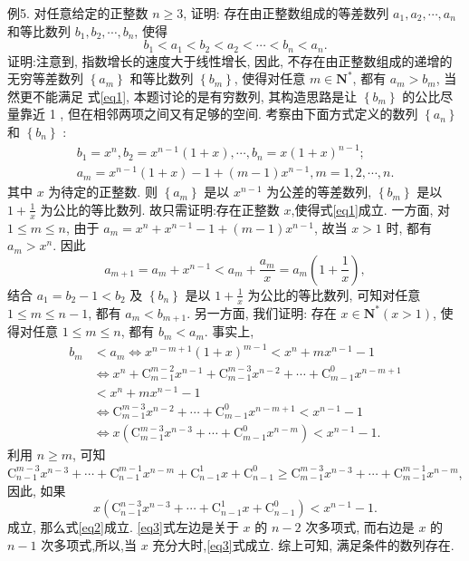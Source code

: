 例5. 对任意给定的正整数 $n \geqslant 3$, 证明: 存在由正整数组成的等差数列 $a_1, a_2, \cdots, a_n$ 和等比数列 $b_1, b_2, \cdots, b_n$, 使得
$$
b_1<a_1<b_2<a_2<\cdots<b_n<a_n . \label{eq1}
$$
证明:注意到, 指数增长的速度大于线性增长, 因此, 不存在由正整数组成的递增的无穷等差数列 $\left\{a_m\right\}$ 和等比数列 $\left\{b_m\right\}$, 使得对任意 $m \in \mathbf{N}^*$, 都有 $a_m>b_m$, 当然更不能满足 式\ref{eq1}, 本题讨论的是有穷数列, 其构造思路是让 $\left\{b_m\right\}$ 的公比尽量靠近 1 , 但在相邻两项之间又有足够的空间.
考察由下面方式定义的数列 $\left\{a_n\right\}$ 和 $\left\{b_n\right\}$ :
$$
\begin{gathered}
b_1=x^n, b_2=x^{n-1}(1+x), \cdots, b_n=x(1+x)^{n-1} ; \\
a_m=x^{n-1}(1+x)-1+(m-1) x^{n-1}, m=1,2, \cdots, n .
\end{gathered}
$$
其中 $x$ 为待定的正整数.
则 $\left\{a_m\right\}$ 是以 $x^{n-1}$ 为公差的等差数列, $\left\{b_m\right\}$ 是以 $1+\frac{1}{x}$
为公比的等比数列.
故只需证明:存在正整数 $x$,使得式\ref{eq1}成立.
一方面, 对 $1 \leqslant m \leqslant n$, 由于 $a_m=x^n+x^{n-1}-1+(m-1) x^{n-1}$, 故当 $x>1$ 时, 都有 $a_m>x^n$. 因此
$$
a_{m+1}=a_m+x^{n-1}<a_m+\frac{a_m}{x}=a_m\left(1+\frac{1}{x}\right),
$$
结合 $a_1=b_2-1<b_2$ 及 $\left\{b_n\right\}$ 是以 $1+\frac{1}{x}$ 为公比的等比数列, 可知对任意 $1 \leqslant m \leqslant n-1$, 都有 $a_m<b_{m+1}$.
另一方面, 我们证明: 存在 $x \in \mathbf{N}^*(x>1)$, 使得对任意 $1 \leqslant m \leqslant n$, 都有 $b_m<a_m$.
事实上,
$$
\begin{aligned}
b_m & <a_m \Leftrightarrow x^{n-m+1}(1+x)^{m-1}<x^n+m x^{n-1}-1 \\
& \Leftrightarrow x^n+\mathrm{C}_{m-1}^{m-2} x^{n-1}+\mathrm{C}_{m-1}^{m-3} x^{n-2}+\cdots+\mathrm{C}_{m-1}^0 x^{n-m+1} \\
& <x^n+m x^{n-1}-1 \\
& \Leftrightarrow \mathrm{C}_{m-1}^{m-3} x^{n-2}+\cdots+\mathrm{C}_{m-1}^0 x^{n-m+1}<x^{n-1}-1 \\
& \Leftrightarrow x\left(\mathrm{C}_{m-1}^{m-3} x^{n-3}+\cdots+\mathrm{C}_{m-1}^0 x^{n-m}\right)<x^{n-1}-1 .
\end{aligned} \label{eq2}
$$
利用 $n \geqslant m$, 可知 $\mathrm{C}_{n-1}^{m-3} x^{n-3}+\cdots+\mathrm{C}_{n-1}^{m-1} x^{n-m}+\mathrm{C}_{n-1}^1 x+\mathrm{C}_{n-1}^0 \geqslant \mathrm{C}_{m-1}^{m-3} x^{n-3}+\cdots+ \mathrm{C}_{m-1}^{m-1} x^{n-m}$, 因此, 如果
$$
x\left(\mathrm{C}_{n-1}^{n-3} x^{n-3}+\cdots+\mathrm{C}_{n-1}^1 x+\mathrm{C}_{n-1}^0\right)<x^{n-1}-1 . \label{eq3}
$$
成立, 那么式\ref{eq2}成立.
\ref{eq3}式左边是关于 $x$ 的 $n-2$ 次多项式, 而右边是 $x$ 的 $n-1$ 次多项式,所以,当 $x$ 充分大时,\ref{eq3}式成立.
综上可知, 满足条件的数列存在.



